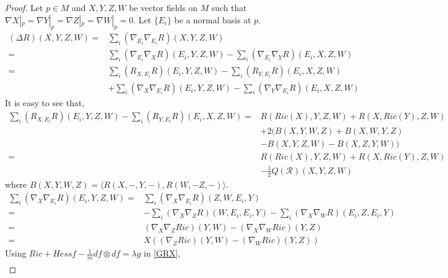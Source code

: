 \documentclass[12pt]{amsart}
\theoremstyle{definition}
\numberwithin{equation}{section}
\begin{document}
\begin{proof}
    Let $p \in M$ and $X,Y,Z,W$ be vector fields on $M$ such that $\nabla X|_{p} = \nabla Y|_{p} = \nabla Z|_{p} = \nabla W|_{p} = 0$. Let $\{E_{i}\}$ be a normal basis at $p$.
    {\small
    \begin{align}\label{LRE}
        (\Delta R)(X,Y,Z,W)=&\sum_{i}(\nabla_{E_{i}}\nabla_{E_{i}}R)(X,Y,Z,W)\nonumber\\=&\sum_{i}(\nabla_{E_{i}}\nabla_{X}R)(E_{i},Y,Z,W) - \sum_{i}(\nabla_{E_{i}}\nabla_{Y}R)(E_{i},X,Z,W)\nonumber\\=&\sum_{i}(R_{X,E_{i}}R)(E_{i},Y,Z,W) - \sum_{i}(R_{Y,E_{i}}R)(E_{i},X,Z,W)\nonumber\\&+ \sum_{i}(\nabla_{X}\nabla_{E_{i}}R)(E_{i},Y,Z,W) - \sum_{i}(\nabla_{Y}\nabla_{E_{i}}R)(E_{i},X,Z,W)
    \end{align}}
    It is easy to see that,
{\small
    \begin{align}\label{CCE}
    \sum_{i}(R_{X,E_{i}}R)(E_{i},Y,Z,W) - \sum_{i}(R_{Y,E_{i}}R)(E_{i},X,Z,W)=& R(Ric(X),Y,Z,W) + R(X,Ric(Y),Z,W)\nonumber\\
    &+ 2(B(X,Y,W,Z) + B(X,W,Y,Z) \nonumber\\& - B(X,Y,Z,W) - B(X,Z,Y,W))\nonumber\\=& R(Ric(X),Y,Z,W) + R(X,Ric(Y),Z,W)\nonumber\\&-\frac{1}{2}Q(\mathcal{R})(X,Y,Z,W)
    \end{align}}
    where $B(X,Y,W,Z) = \langle R(X,-,Y,-),R(W,-Z,-)\rangle$.
    {\small
    \begin{align}\label{GRX}
        \sum_{i}(\nabla_{X}\nabla_{E_{i}}R)(E_{i},Y,Z,W) =&\sum_{i}(\nabla_{X}\nabla_{E_{i}}R)(Z,W,E_{i},Y)\nonumber\\=&-\sum_{i}(\nabla_{X}\nabla_{Z}R)(W,E_{i},E_{i},Y)-\sum_{i}(\nabla_{X}\nabla_{W}R)(E_{i},Z,E_{i},Y)\nonumber\\=&(\nabla_{X}\nabla_{Z}Ric)(Y,W) - (\nabla_{X}\nabla_{W}Ric)(Y,Z)\nonumber\\=& X((\nabla_{Z}Ric)(Y,W)- (\nabla_{W}Ric)(Y,Z))
    \end{align}}
Using $Ric + Hessf - \frac{1}{m}df \otimes df = \lambda g$ in \cref{GRX},
{\small
\begin{align}\label{GRXSE}

\end{align}}
\end{proof}
\end{document}
